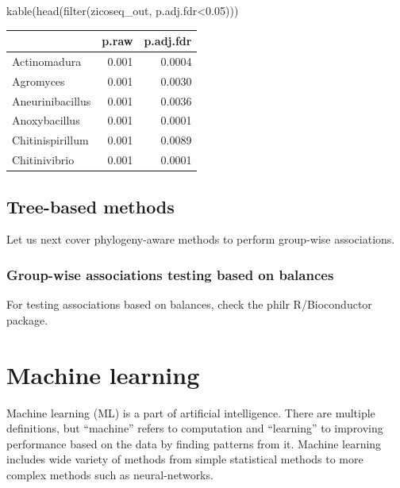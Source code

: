 \documentclass[
]{book}
\newenvironment{Shaded}{\begin{snugshade}}{\end{snugshade}}
\newcommand{\FloatTok}[1]{\textcolor[rgb]{0.00,0.00,0.81}{#1}}
\newcommand{\FunctionTok}[1]{\textcolor[rgb]{0.00,0.00,0.00}{#1}}
\newcommand{\NormalTok}[1]{#1}
\newcommand{\SpecialCharTok}[1]{\textcolor[rgb]{0.00,0.00,0.00}{#1}}
\begin{document}
\begin{Shaded}
\begin{Highlighting}[]
\FunctionTok{kable}\NormalTok{(}\FunctionTok{head}\NormalTok{(}\FunctionTok{filter}\NormalTok{(zicoseq\_out, p.adj.fdr}\SpecialCharTok{\textless{}}\FloatTok{0.05}\NormalTok{)))}
\end{Highlighting}
\end{Shaded}

\begin{tabular}{l|r|r}
\hline
  & p.raw & p.adj.fdr\\
\hline
Actinomadura & 0.001 & 0.0004\\
\hline
Agromyces & 0.001 & 0.0030\\
\hline
Aneurinibacillus & 0.001 & 0.0036\\
\hline
Anoxybacillus & 0.001 & 0.0001\\
\hline
Chitinispirillum & 0.001 & 0.0089\\
\hline
Chitinivibrio & 0.001 & 0.0001\\
\hline
\end{tabular}

\hypertarget{tree-based-methods}{%
\section{Tree-based methods}\label{tree-based-methods}}

Let us next cover phylogeny-aware methods to perform group-wise
associations.

\hypertarget{group-wise-associations-testing-based-on-balances}{%
\subsection{Group-wise associations testing based on balances}\label{group-wise-associations-testing-based-on-balances}}

For testing associations based on balances, check the philr
R/Bioconductor package.

\hypertarget{machine_learning}{%
\chapter{Machine learning}\label{machine_learning}}

Machine learning (ML) is a part of artificial intelligence. There are multiple
definitions, but ``machine'' refers to computation and ``learning'' to improving
performance based on the data by finding patterns from it. Machine learning
includes wide variety of methods from simple statistical methods to more
complex methods such as neural-networks.
\end{document}
